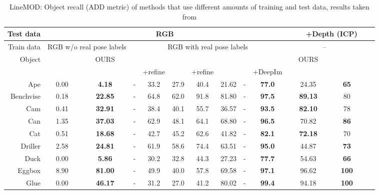 {{\begin{table}[t]
	\scriptsize
	\captionsetup{justification=centering,width=0.8\textwidth}
	\caption{LineMOD: Object recall (ADD \cite{hinterstoisser2012model} metric) of methods that use different amounts of training and test data, results taken from \cite{tekin2017real}}
	\begin{adjustbox}{max width=\textwidth}
		\begin{tabular}{r|cc|ccccccc|ccc}
			
			Test data&\multicolumn{9}{c}{RGB}& \multicolumn{3}{|c}{$\qquad$ +Depth (ICP)$\qquad$}\\
			\toprule
			Train data&\multicolumn{2}{c|}{RGB w/o real pose labels}& \multicolumn{7}{c}{RGB with real pose labels} & \multicolumn{2}{|c}{--}\\
			\toprule
			Object &\citeauthor{kehl2017ssd} & OURS & \multicolumn{2}{c}{\citeauthor{brachmann2016uncertainty}} & \multicolumn{2}{c}{\citeauthor{rad2017bb8}} &\citeauthor{tekin2017real} & \multicolumn{2}{c|}{\citeauthor{xiang2017posecnn}} & OURS & \citeauthor{kehl2017ssd} \\
			\toprule
			&&&& +refine && +refine &&& +DeepIm \\
			\midrule
			Ape & 0.00 &   \textbf{4.18} &      -& 	33.2& 27.9& 40.4& 21.62            & -& \textbf{77.0} & 24.35 &\textbf{65}\\
			Benchvise &  0.18 &\textbf{22.85}&  -& 	64.8& 62.0& 91.8& 81.80   & -& \textbf{97.5} & \textbf{89.13}&80\\
			Cam &0.41 & \textbf{32.91}&         -& 	38.4& 40.1& 55.7& 36.57            & -& \textbf{93.5} & \textbf{82.10}&78\\
			Can & 1.35 &   \textbf{37.03}&      -& 	62.9& 48.1& 64.1& 68.80   & -& \textbf{96.5} & 70.82&\textbf{86}\\
			Cat &  0.51 & \textbf{18.68}&       -& 	42.7& 45.2& 62.6& 41.82            & -& \textbf{82.1} & \textbf{72.18}&70\\
			Driller &  2.58 & \textbf{24.81}&   -& 	61.9& 58.6& 74.4& 63.51   & -& \textbf{95.0} & 44.87&\textbf{73}\\
			Duck & 0.00 & \textbf{5.86}&        -& 	30.2& 32.8& 44.3& 27.23            & -& \textbf{77.7} & 54.63 &\textbf{66}\\
			Eggbox & 8.90 & \textbf{81.00}&     -& 	49.9& 40.0& 57.8& 69.58   & -& \textbf{97.1} & 96.62&\textbf{100}\\
			Glue&0.00  & \textbf{46.17}&        -& 	31.2& 27.0& 41.2& 80.02   & -& \textbf{99.4} & 94.18&\textbf{100}\\

\end{tabular}
\end{adjustbox}
\end{table}}}

